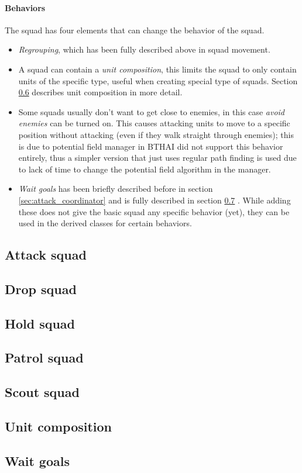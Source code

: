 \paragraph{Behaviors}
The squad has four elements that can change the behavior of the squad.
\begin{itemize}
	\item \emph{Regrouping}, which has been fully described above in squad movement.
	\item A squad can contain a \emph{unit composition}, this limits the squad to only contain units of the specific type, useful when creating special type of squads. Section \ref{sec:unit_composition} describes unit composition in more detail.
	\item Some squads usually don't want to get close to enemies, in this case \emph{avoid enemies} can be turned on. This causes attacking units to move to a specific position without attacking (even if they walk straight through enemies); this is due to potential field manager in BTHAI did not support this behavior entirely, thus a simpler version that just uses regular path finding is used due to lack of time to change the potential field algorithm in the manager.
	\item \emph{Wait goals} has been briefly described before in section \ref{sec:attack_coordinator}  and is fully described in section \ref{sec:wait_goals} . While adding these does not give the basic squad any specific behavior (yet), they can be used in the derived classes for certain behaviors.
\end{itemize}

\subsection{Attack squad}
\label{sec:attack_squad}

\subsection{Drop squad}

\subsection{Hold squad}
\label{sec:hold_squad}

\subsection{Patrol squad}

\subsection{Scout squad}

\subsection{Unit composition}
\label{sec:unit_composition}

\subsection{Wait goals}
\label{sec:wait_goals}
